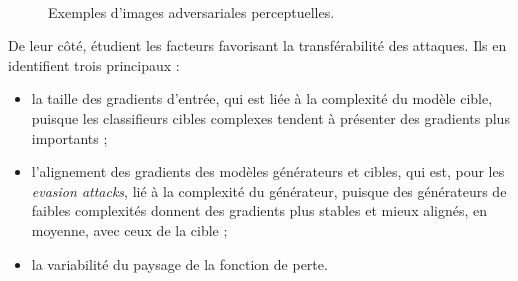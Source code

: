 \documentclass{article}
\begin{document}
\begin{figure}
\\
\caption{Exemples d'images adversariales perceptuelles.}
\label{fig:NRDM}
\end{figure}

\noindent De leur côté, \citet{Demontis2018WhyDA} étudient les facteurs favorisant la transférabilité des attaques. Ils en identifient trois principaux :
\begin{itemize}
    \item la taille des gradients d'entrée, qui est liée à la complexité du modèle cible, puisque les classifieurs cibles complexes tendent à présenter des gradients plus importants ;
    \item l'alignement des gradients des modèles générateurs et cibles, qui est, pour les \textit{evasion attacks}, lié à la complexité du générateur, puisque des générateurs de faibles complexités donnent des gradients plus stables et mieux alignés, en moyenne, avec ceux de la cible ;
    \item la variabilité du paysage de la fonction de perte.
\end{itemize}
\end{document}
